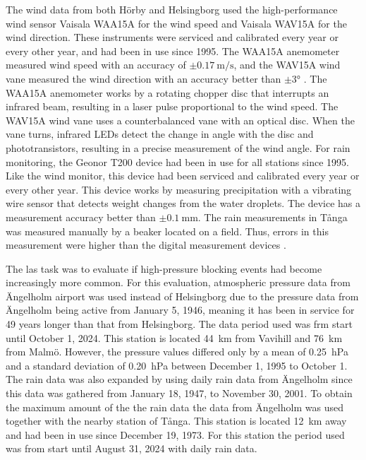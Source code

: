 The wind data from both Hörby and Helsingborg used the high-performance wind sensor Vaisala WAA15A for the wind speed and Vaisala WAV15A for the wind direction. These instruments were serviced and calibrated every year or every other year, and had been in use since 1995. The WAA15A anemometer measured wind speed with an accuracy of $\pm\SI{0.17}{\m\per\s}$, and the WAV15A wind vane measured the wind direction with an accuracy better than $\pm\ang{3}$ \cite{vaisalaWindSetWA152021}. The WAA15A anemometer works by a rotating chopper disc that interrupts an infrared beam, resulting in a laser pulse proportional to the wind speed. The WAV15A wind vane uses a counterbalanced vane with an optical disc. When the vane turns, infrared LEDs detect the change in angle with the disc and phototransistors, resulting in a precise measurement of the wind angle. For rain monitoring, the Geonor T200 device had been in use for all stations since 1995. Like the wind monitor, this device had been serviced and calibrated every year or every other year. This device works by measuring precipitation with a vibrating wire sensor that detects weight changes from the water droplets\cite{geonorinc.T200BSeriesAll2019}. The device has a measurement accuracy better than $\pm\SI{0.1}{\mm}$. The rain measurements in Tånga was measured manually by a beaker located on a field. Thus, errors in this measurement were higher than the digital measurement devices . 

The las task was to evaluate if high-pressure blocking events had become increasingly more common. For this evaluation, atmospheric pressure data from Ängelholm airport was used instead of Helsingborg due to the pressure data from Ängelholm being active from January 5, 1946, meaning it has been in service for 49 years longer than that from Helsingborg. The data period used was frm start until October 1, 2024. This station is located \SI{44}{\km} from Vavihill and \SI{76}{\km} from Malmö. However, the pressure values differed only by a mean of \SI{0.25}{\hecto\pascal} and a standard deviation of \SI{0.20}{\hecto\pascal} between December 1, 1995 to October 1. The rain data was also expanded by using daily rain data from Ängelholm since this data was gathered from January 18, 1947, to November 30, 2001. To obtain the maximum amount of the the rain data the data from Ängelholm was used together with the nearby station of Tånga. This station is located \SI{12}{\km} away and had been in use since December 19, 1973. For this station the period used was from start until August 31, 2024 with daily rain data.  


